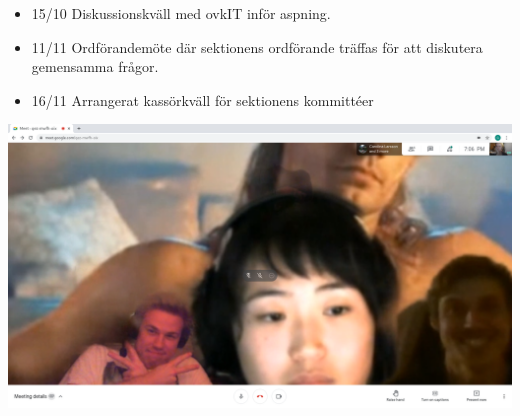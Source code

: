 \documentclass[11pt, noincludeaddress, nopagination]{classes/cthit}
\begin{document}
\begin{itemize}
    \item 15/10 Diskussionskväll med ovkIT inför aspning.
    \item 11/11 Ordförandemöte där sektionens ordförande träffas för att diskutera gemensamma frågor.
    \item 16/11 Arrangerat kassörkväll för sektionens kommittéer
\end{itemize}
\includegraphics[scale=0.3]{bild.png}
\end{document}
